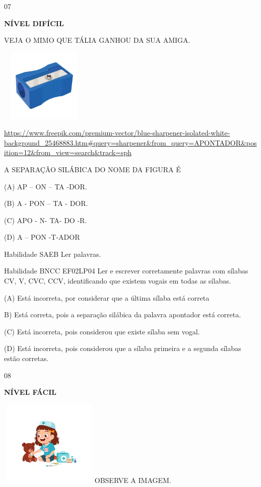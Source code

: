 {{\num{07}

\textbf{NÍVEL DIFÍCIL}

VEJA O MIMO QUE TÁLIA GANHOU DA SUA AMIGA.

\includegraphics[width=1.67273in,height=1.37251in]{media/image168.jpeg}

\url{https://www.freepik.com/premium-vector/blue-sharpener-isolated-white-background_25468883.htm\#query=sharpener\&from_query=APONTADOR\&position=12\&from_view=search\&track=sph}

A SEPARAÇÃO SILÁBICA DO NOME DA FIGURA É

(A) AP -- ON -- TA -DOR.

(B) A - PON -- TA - DOR.

(C) APO - N- TA- DO -R.

(D) A -- PON -T-ADOR

Habilidade SAEB Ler palavras.

Habilidade BNCC EF02LP04 Ler e escrever corretamente palavras com
sílabas CV, V, CVC, CCV, identificando que existem vogais em todas as
sílabas.

(A) \protect\hypertarget{_Hlk129375975}{}{}Está incorreta, por
considerar que a última sílaba está correta

B) Está correta, pois a separação silábica da palavra apontador está
correta.

(C) Está incorreta, pois considerou que existe sílaba sem vogal.

(D) Está incorreta, pois considerou que a sílaba primeira e a segunda
sílabas estão corretas.

\num{08}

\textbf{NÍVEL FÁCIL}

\includegraphics[width=1.87273in,height=1.62645in]{media/image169.jpeg}OBSERVE
A IMAGEM.

}}
